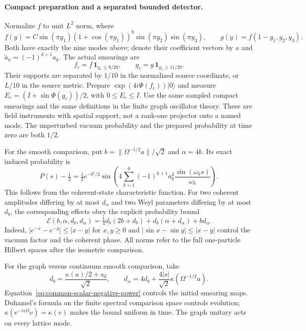 \paragraph{Compact preparation and a separated bounded detector.}
Normalize $f$ to unit $L^2$ norm, where
\[
 f(y)=C\sin(\pi y_1)(1+\cos(\pi y_1))^8
                 \sin(\pi y_2)\sin(\pi y_3),\qquad
 g(y)=f(1-y_1,y_2,y_3).
\]
Both have exactly the nine modes above; denote their coefficient vectors
by $a$ and $\widetilde a_k=(-1)^{k+1}a_k$.
The actual smearings are
\[
 f_c=f\,\mathbf1_{y_1\le9/20},\qquad
 g_c=g\,\mathbf1_{y_1\ge11/20}.
\]
Their supports are separated by $1/10$ in the normalized source coordinate,
or $L/10$ in the source metric.
Prepare $\exp(4i\Phi(f_c))|0\rangle$ and measure
$E_c=(I+\sin\Phi(g_c))/2$, with $0\le E_c\le I$.
Use the same sampled compact smearings and the same definitions in the
finite graph oscillator theory. These are field instruments with spatial
support, not a rank-one projector onto a named mode.
The unperturbed vacuum probability and the prepared probability at time
zero are both $1/2$.

For the smooth comparison, put
$b=\|\Omega^{-1/2}a\|/\sqrt2$ and $\alpha=4b$.
Its exact induced probability is
\begin{equation}
 P(s)-\tfrac12=
 \tfrac12e^{-b^2/2}\sin\!\left(
 4\sum_{k=1}^9(-1)^{k+1}a_k^2
                      \frac{\sin(\omega_ks)}{\omega_k}\right).
 \label{eq:common-scalar-probability}
\end{equation}
This follows from the coherent-state characteristic function. For two
coherent amplitudes differing by at most $d_\alpha$ and two Weyl parameters
differing by at most $d_b$, the corresponding effects obey the explicit
probability bound
\begin{equation}
 \mathcal E(b,\alpha,d_b,d_\alpha)=
 \tfrac14d_b(2b+d_b)+d_b(\alpha+d_\alpha)+bd_\alpha.
 \label{eq:common-scalar-gaussian-error}
\end{equation}
Indeed, $|e^{-x}-e^{-y}|\le|x-y|$ for $x,y\ge0$ and
$|\sin x-\sin y|\le|x-y|$ control the vacuum factor and the coherent
phase. All norms refer to the full one-particle Hilbert spaces after the
isometric comparison.

For the graph versus continuum smooth comparison, take
\[
 d_b=\frac{\kappa(a)/2+s_d}{\sqrt2},\qquad
 d_\alpha=4d_b+\frac{4|s|}{\sqrt2}\kappa(\Omega^{-1/2}a).
\]
Equation~\eqref{eq:common-scalar-negative-power} controls the initial
smearing maps. Duhamel's formula on the finite spectral comparison space
controls evolution; $\kappa(e^{-is\Omega}v)=\kappa(v)$ makes the bound
uniform in time. The graph unitary acts on every lattice mode.

